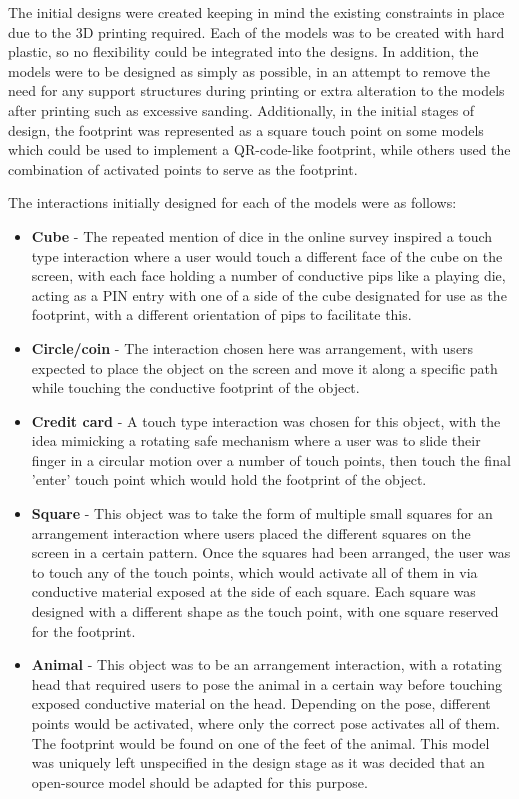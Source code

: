 \documentclass{l4proj}
\begin{document}
The initial designs were created keeping in mind the existing constraints in place due to the 3D printing required. Each of the models was to be created with hard plastic, so no flexibility could be integrated into the designs. In addition, the models were to be designed as simply as possible, in an attempt to remove the need for any support structures during printing or extra alteration to the models after printing such as excessive sanding. Additionally, in the initial stages of design, the footprint was represented as a square touch point on some models which could be used to implement a QR-code-like footprint, while others used the combination of activated points to serve as the footprint.

The interactions initially designed for each of the models were as follows:
\begin{itemize}
    \item \textbf{Cube} - The repeated mention of dice in the online survey inspired a touch type interaction where a user would touch a different face of the cube on the screen, with each face holding a number of conductive pips like a playing die, acting as a PIN entry with one of a side of the cube designated for use as the footprint, with a different orientation of pips to facilitate this.
    \item \textbf{Circle/coin} - The interaction chosen here was arrangement, with users expected to place the object on the screen and move it along a specific path while touching the conductive footprint of the object.
    \item \textbf{Credit card} - A touch type interaction was chosen for this object, with the idea mimicking a rotating safe mechanism where a user was to slide their finger in a circular motion over a number of touch points, then touch the final 'enter' touch point which would hold the footprint of the object.
    \item \textbf{Square} - This object was to take the form of multiple small squares for an arrangement interaction where users placed the different squares on the screen in a certain pattern. Once the squares had been arranged, the user was to touch any of the touch points, which would activate all of them in via conductive material exposed at the side of each square. Each square was designed with a different shape as the touch point, with one square reserved for the footprint.
    \item \textbf{Animal} - This object was to be an arrangement interaction, with a rotating head that required users to pose the animal in a certain way before touching exposed conductive material on the head. Depending on the pose, different points would be activated, where only the correct pose activates all of them. The footprint would be found on one of the feet of the animal. This model was uniquely left unspecified in the design stage as it was decided that an open-source model should be adapted for this purpose.

\end{itemize}
\end{document}
